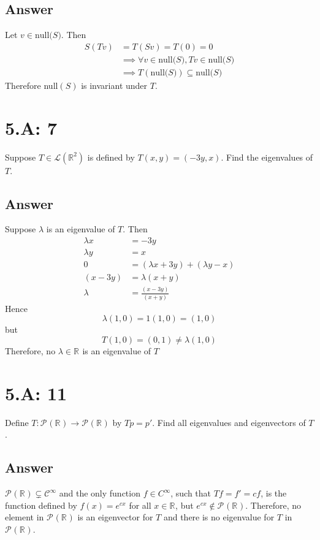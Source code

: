 \documentclass[
	12pt, %
]{fphw}
\newcommand\0{\mathbf{0}}
\newcommand\R[1]{\text{$\mathbb{R}^{#1}$}}
\newcommand\nulll[1]{\text{null($#1$)}}
\newcommand\poly[1]{\text{$\mathcal{P}_{#1}(\R{})$}}
\renewcommand\L[1]{\mathcal{L}(#1)}
\begin{document}
\subsection*{Answer}
Let $v \in \nulll S$. Then
\begin{align*}
S(Tv) &= T(Sv) = T(0) = 0\\ 
&\implies \forall v \in \nulll S, Tv \in \nulll S\\
&\implies T(\nulll S) \subseteq \nulll S
\end{align*}
Therefore null$(S)$ is invariant under $T$.

\section*{5.A: 7}
\begin{problem}
Suppose $T \in \L{\R{2}}$ is defined by $T(x,y) = (-3y,x)$. Find the eigenvalues of $T$.
\end{problem}
\subsection*{Answer}
Suppose $\lambda$ is an eigenvalue of $T$. Then
\begin{align*}
\lambda x &= -3y\\
\lambda y &= x\\
0 &= (\lambda x + 3y) + (\lambda y - x)\\
(x-3y) &= \lambda(x+y)\\
\lambda &= \frac{(x-3y)}{(x+y)}
\end{align*}
Hence
$$
\lambda (1,0) = 1 (1, 0) = (1, 0)
$$
but
$$
T(1, 0) = (0,1) \ne \lambda (1,0)
$$
Therefore, no $\lambda \in \R{}$ is an eigenvalue of $T$


\section*{5.A: 11}
\begin{problem}
Define $T: \poly{} \to \poly{}$ by $Tp = p'$. Find all eigenvalues and eigenvectors of $T$.
\end{problem}
\subsection*{Answer}
$\poly{} \subsetneq \mathcal{C}^\infty$ and the only function $f \in C^\infty$, such that $Tf = f' = cf$, is the function defined by $f(x) = e^{cx}$ for all $x \in \R{}$, but $e^{cx} \not \in \poly{}$. Therefore, no element in $\poly{}$ is an eigenvector for $T$ and there is no eigenvalue for $T$ in $\poly{}$.
\end{document}
